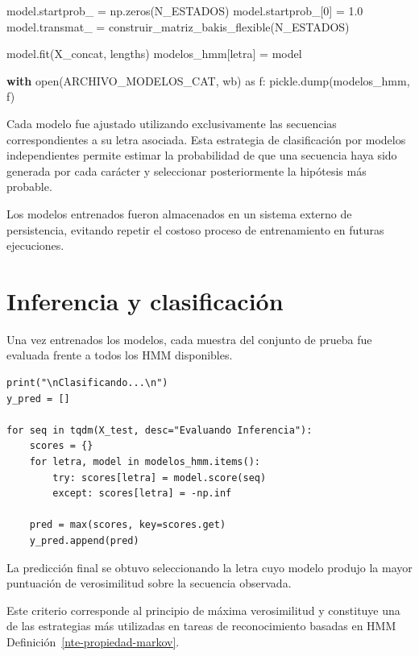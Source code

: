 \documentclass[
  spanish,
  us-letterpaper,
  DIV=11,
  numbers=noendperiod]{scrreprt}
\newenvironment{Shaded}{\begin{snugshade}}{\end{snugshade}}
\newcommand{\BuiltInTok}[1]{\textcolor[rgb]{0.00,0.23,0.31}{#1}}
\newcommand{\ControlFlowTok}[1]{\textcolor[rgb]{0.00,0.23,0.31}{\textbf{#1}}}
\newcommand{\DecValTok}[1]{\textcolor[rgb]{0.68,0.00,0.00}{#1}}
\newcommand{\FloatTok}[1]{\textcolor[rgb]{0.68,0.00,0.00}{#1}}
\newcommand{\ImportTok}[1]{\textcolor[rgb]{0.00,0.46,0.62}{#1}}
\newcommand{\NormalTok}[1]{\textcolor[rgb]{0.00,0.23,0.31}{#1}}
\newcommand{\OperatorTok}[1]{\textcolor[rgb]{0.37,0.37,0.37}{#1}}
\newcommand{\StringTok}[1]{\textcolor[rgb]{0.13,0.47,0.30}{#1}}
\begin{document}
\begin{Shaded}
\begin{Highlighting}[]
\NormalTok{        model.startprob\_ }\OperatorTok{=}\NormalTok{ np.zeros(N\_ESTADOS)}
\NormalTok{        model.startprob\_[}\DecValTok{0}\NormalTok{] }\OperatorTok{=} \FloatTok{1.0}
\NormalTok{        model.transmat\_ }\OperatorTok{=}\NormalTok{ construir\_matriz\_bakis\_flexible(N\_ESTADOS)}

\NormalTok{        model.fit(X\_concat, lengths)}
\NormalTok{        modelos\_hmm[letra] }\OperatorTok{=}\NormalTok{ model}

    \ControlFlowTok{with} \BuiltInTok{open}\NormalTok{(ARCHIVO\_MODELOS\_CAT, }\StringTok{\textquotesingle{}wb\textquotesingle{}}\NormalTok{) }\ImportTok{as}\NormalTok{ f:}
\NormalTok{        pickle.dump(modelos\_hmm, f)}
\end{Highlighting}
\end{Shaded}

Cada modelo fue ajustado utilizando exclusivamente las secuencias
correspondientes a su letra asociada. Esta estrategia de clasificación
por modelos independientes permite estimar la probabilidad de que una
secuencia haya sido generada por cada carácter y seleccionar
posteriormente la hipótesis más probable.

Los modelos entrenados fueron almacenados en un sistema externo de
persistencia, evitando repetir el costoso proceso de entrenamiento en
futuras ejecuciones.

\section{Inferencia y
clasificación}\label{inferencia-y-clasificaciuxf3n}

Una vez entrenados los modelos, cada muestra del conjunto de prueba fue
evaluada frente a todos los HMM disponibles.

\begin{verbatim}
print("\nClasificando...\n")
y_pred = []

for seq in tqdm(X_test, desc="Evaluando Inferencia"):
    scores = {}
    for letra, model in modelos_hmm.items():
        try: scores[letra] = model.score(seq)
        except: scores[letra] = -np.inf

    pred = max(scores, key=scores.get)
    y_pred.append(pred)
\end{verbatim}

La predicción final se obtuvo seleccionando la letra cuyo modelo produjo
la mayor puntuación de verosimilitud sobre la secuencia observada.

Este criterio corresponde al principio de máxima verosimilitud y
constituye una de las estrategias más utilizadas en tareas de
reconocimiento basadas en HMM Definición~\ref{nte-propiedad-markov}.
\end{document}
